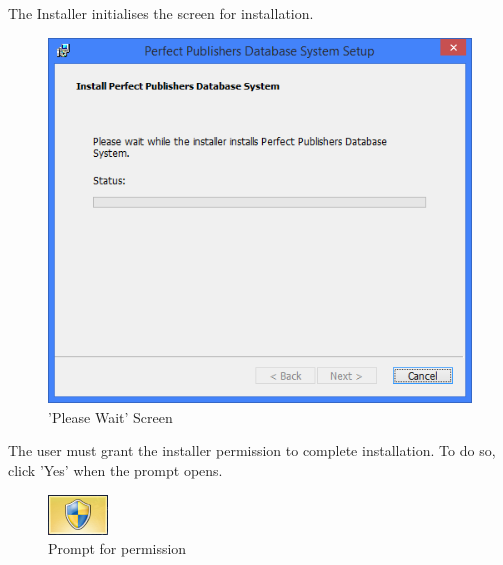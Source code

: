 The Installer initialises the screen for installation.

\begin{figure}[H]
    \includegraphics[width=\textwidth]{./Manual/Installation/PleaseWaitScreen.png}
    \caption{'Please Wait' Screen}
\end{figure}

The user must grant the installer permission to complete installation. To do so, click 'Yes' when the prompt opens.

\begin{figure}[H]
    \includegraphics[width=\textwidth]{./Manual/Installation/Permission.png}
    \caption{Prompt for permission}
\end{figure}

